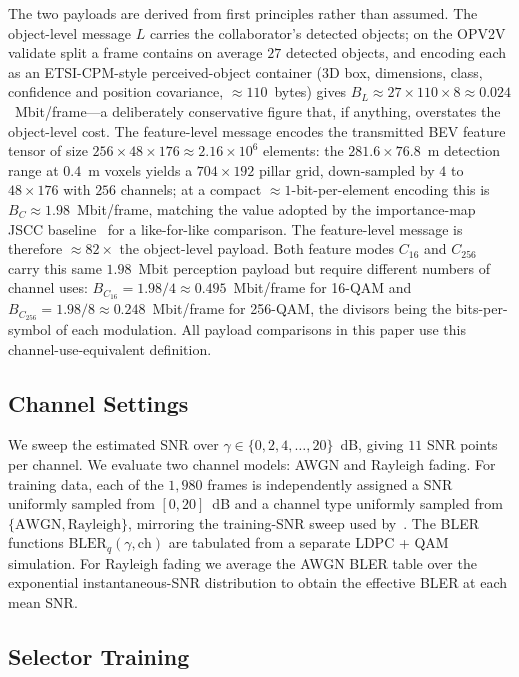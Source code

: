 \documentclass[journal]{IEEEtran}
\begin{document}
The two payloads are derived from first principles rather than assumed. The object-level message $L$ carries the collaborator's detected objects; on the OPV2V validate split a frame contains on average $27$ detected objects, and encoding each as an ETSI-CPM-style perceived-object container (3D box, dimensions, class, confidence and position covariance, ${\approx}110$~bytes) gives $B_L \approx 27 \times 110 \times 8 \approx 0.024$~Mbit/frame---a deliberately conservative figure that, if anything, overstates the object-level cost. The feature-level message encodes the transmitted BEV feature tensor of size $256 \times 48 \times 176 \approx 2.16\times10^{6}$ elements: the $281.6 \times 76.8$~m detection range at $0.4$~m voxels yields a $704 \times 192$ pillar grid, down-sampled by $4$ to $48 \times 176$ with $256$ channels; at a compact ${\approx}1$-bit-per-element encoding this is $B_C \approx 1.98$~Mbit/frame, matching the value adopted by the importance-map JSCC baseline~\cite{sheng2024importance} for a like-for-like comparison. The feature-level message is therefore ${\approx}82\times$ the object-level payload. Both feature modes $C_{16}$ and $C_{256}$ carry this same $1.98$~Mbit perception payload but require different numbers of channel uses: $B_{C_{16}}=1.98/4 \approx 0.495$~Mbit/frame for 16-QAM and $B_{C_{256}}=1.98/8 \approx 0.248$~Mbit/frame for 256-QAM, the divisors being the bits-per-symbol of each modulation. All payload comparisons in this paper use this channel-use-equivalent definition.

\subsection{Channel Settings}

We sweep the estimated SNR over $\gamma \in \{0,2,4,\ldots,20\}$~dB, giving $11$ SNR points per channel. We evaluate two channel models: AWGN and Rayleigh fading. For training data, each of the $1{,}980$ frames is independently assigned a SNR uniformly sampled from $[0,20]$~dB and a channel type uniformly sampled from $\{\text{AWGN},\text{Rayleigh}\}$, mirroring the training-SNR sweep used by~\cite{sheng2024importance,gan2026scomcp}. The BLER functions $\mathrm{BLER}_q(\gamma,\text{ch})$ are tabulated from a separate LDPC + QAM simulation. For Rayleigh fading we average the AWGN BLER table over the exponential instantaneous-SNR distribution to obtain the effective BLER at each mean SNR.

\subsection{Selector Training}
\end{document}
